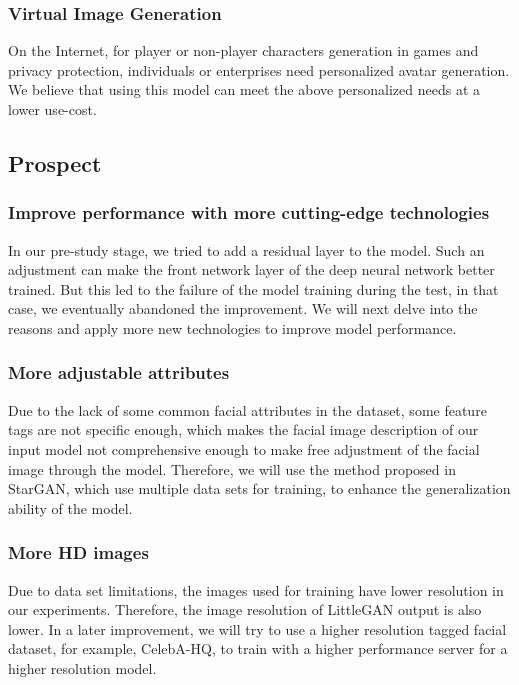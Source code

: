 \subsubsection*{Virtual Image Generation}
On the Internet, for player or non-player characters generation in games and privacy protection,
individuals or enterprises need personalized avatar generation.
We believe that using this model can meet the above personalized needs at a lower use-cost.

\subsection{Prospect}
\subsubsection*{Improve performance with more cutting-edge technologies}

In our pre-study stage, we tried to add a residual layer to the model.
Such an adjustment can make the front network layer of the deep neural network better trained.
But this led to the failure of the model training during the test, in that case, we eventually abandoned the improvement.
We will next delve into the reasons and apply more new technologies to improve model performance.


\subsubsection*{More adjustable attributes}

Due to the lack of some common facial attributes in the dataset, some feature tags are not specific enough, which makes the facial image description of our input model not comprehensive enough to make free adjustment of the facial image through the model.
Therefore, we will use the method proposed in StarGAN, which use multiple data sets for training, to enhance the generalization ability of the model.


\subsubsection*{More HD images}
Due to data set limitations, the images used for training have lower resolution in our experiments.
Therefore, the image resolution of LittleGAN output is also lower.
In a later improvement, we will try to use a higher resolution tagged facial dataset, for example, CelebA-HQ, to train with a higher performance server for a higher resolution model.
